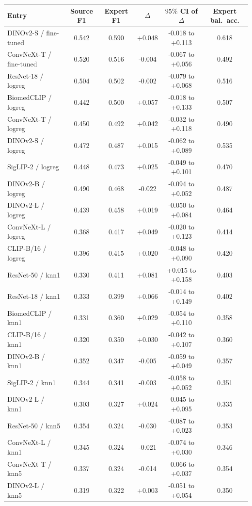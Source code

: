 \begin{tabular}{@{}lccccc@{}}\toprule
Entry & Source F1 & Expert F1 & $\Delta$ & $95\%$ CI of $\Delta$ & Expert bal.\ acc.\\\midrule
DINOv2-S / fine-tuned & 0.542 & 0.590 & +0.048 & -0.018 to +0.113 & 0.618\\
ConvNeXt-T / fine-tuned & 0.520 & 0.516 & -0.004 & -0.067 to +0.056 & 0.492\\
ResNet-18 / logreg & 0.504 & 0.502 & -0.002 & -0.079 to +0.068 & 0.516\\
BiomedCLIP / logreg & 0.442 & 0.500 & +0.057 & -0.018 to +0.133 & 0.507\\
ConvNeXt-T / logreg & 0.450 & 0.492 & +0.042 & -0.032 to +0.118 & 0.490\\
DINOv2-S / logreg & 0.472 & 0.487 & +0.015 & -0.062 to +0.089 & 0.535\\
SigLIP-2 / logreg & 0.448 & 0.473 & +0.025 & -0.049 to +0.101 & 0.470\\
DINOv2-B / logreg & 0.490 & 0.468 & -0.022 & -0.094 to +0.052 & 0.487\\
DINOv2-L / logreg & 0.439 & 0.458 & +0.019 & -0.050 to +0.084 & 0.464\\
ConvNeXt-L / logreg & 0.368 & 0.417 & +0.049 & -0.020 to +0.123 & 0.414\\
CLIP-B/16 / logreg & 0.396 & 0.415 & +0.020 & -0.048 to +0.090 & 0.420\\
ResNet-50 / knn1 & 0.330 & 0.411 & +0.081 & +0.015 to +0.158 & 0.403\\
ResNet-18 / knn1 & 0.333 & 0.399 & +0.066 & -0.014 to +0.149 & 0.402\\
BiomedCLIP / knn1 & 0.331 & 0.360 & +0.029 & -0.054 to +0.110 & 0.358\\
CLIP-B/16 / knn1 & 0.320 & 0.350 & +0.030 & -0.042 to +0.107 & 0.360\\
DINOv2-B / knn1 & 0.352 & 0.347 & -0.005 & -0.059 to +0.049 & 0.357\\
SigLIP-2 / knn1 & 0.344 & 0.341 & -0.003 & -0.058 to +0.052 & 0.351\\
DINOv2-L / knn1 & 0.303 & 0.327 & +0.024 & -0.045 to +0.095 & 0.335\\
ResNet-50 / knn5 & 0.354 & 0.324 & -0.030 & -0.087 to +0.023 & 0.353\\
ConvNeXt-L / knn1 & 0.345 & 0.324 & -0.021 & -0.074 to +0.030 & 0.346\\
ConvNeXt-T / knn5 & 0.337 & 0.324 & -0.014 & -0.066 to +0.037 & 0.354\\
DINOv2-L / knn5 & 0.319 & 0.322 & +0.003 & -0.051 to +0.054 & 0.350\\

\end{tabular}

